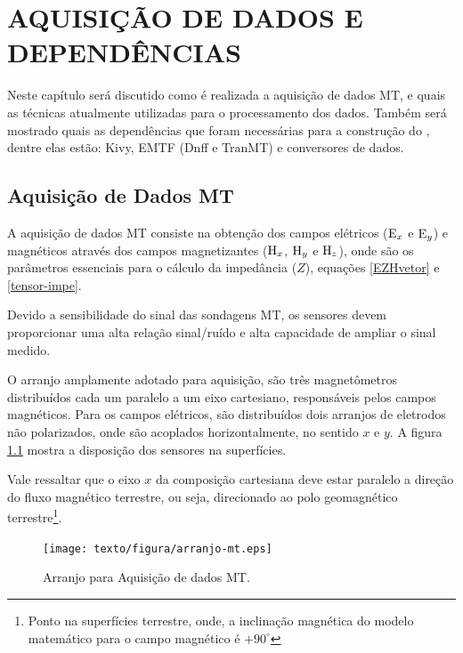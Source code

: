 \chapter{AQUISIÇÃO DE DADOS E DEPENDÊNCIAS}
    
    Neste capítulo será discutido como é realizada a aquisição de dados MT, e quais as técnicas atualmente utilizadas para o processamento dos dados. Também será mostrado quais as dependências que foram necessárias para a construção do \software, dentre elas estão: Kivy, EMTF (Dnff e TranMT) e conversores de dados.
        
    \section{Aquisição de Dados MT}        
    
        A aquisição de dados MT consiste na obtenção dos campos elétricos ($\textrm{E}_x$ e $\textrm{E}_y$) e magnéticos através dos campos magnetizantes ($\textrm{H}_x$, $\textrm{H}_y$ e $\textrm{H}_z$), onde são os parâmetros essenciais para o cálculo da impedância ($Z$), equações \ref{EZHvetor} e \ref{tensor-impe}.
        
        Devido a sensibilidade do sinal das sondagens MT, os sensores devem proporcionar uma alta relação sinal/ruído e alta capacidade de ampliar o sinal medido.
        
        O arranjo amplamente adotado para aquisição, são três magnetômetros distribuídos cada um paralelo a um eixo cartesiano, responsáveis pelos campos magnéticos. Para os campos elétricos, são distribuídos dois arranjos de eletrodos não polarizados, onde são acoplados horizontalmente, no sentido $x$ e $y$. A figura \ref{fig-arranjo-mt} mostra a disposição dos sensores na superfícies.
        
        Vale ressaltar que o eixo $x$ da composição cartesiana deve estar paralelo a direção do fluxo magnético terrestre, ou seja, direcionado ao polo geomagnético terrestre\footnote{Ponto na superfícies terrestre, onde, a inclinação magnética do modelo matemático para o campo magnético é $+90^\circ$}. 
        
        \begin{figure}[H]
            \caption{Arranjo para Aquisição de dados MT.}
                \begin{center}
                    \texttt{[image: texto/figura/arranjo-mt.eps]}
                \end{center}
            \label{fig-arranjo-mt}
        \end{figure}
        
